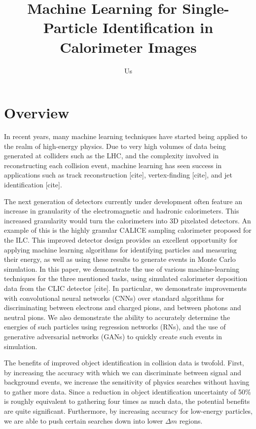 \documentclass{article}
\begin{document}
    \title{Machine Learning for Single-Particle Identification in Calorimeter Images}
    \author{Us}
    \date{}
    \maketitle

    \section*{Overview}

    In recent years, many machine learning techniques have started being applied to the realm of high-energy physics. Due to very high volumes of data being generated at colliders such as the LHC, and the complexity involved in reconstructing each collision event, machine learning has seen success in applications such as track reconstruction [cite], vertex-finding [cite], and jet identification [cite].

    The next generation of detectors currently under development often feature an increase in granularity of the electromagnetic and hadronic calorimeters. This increased granularity would turn the calorimeters into 3D pixelated detectors. An example of this is the highly granular CALICE sampling calorimeter proposed for the ILC. This improved detector design provides an excellent opportunity for applying machine learning algorithms for identifying particles and measuring their energy, as well as using these results to generate events in Monte Carlo simulation.  
    In this paper, we demonstrate the use of various machine-learning techniques for the three mentioned tasks, using simulated calorimeter deposition data from the CLIC detector [cite]. In particular, we demonstrate improvements with convolutional neural networks (CNNs) over standard algorithms for discriminating between electrons and charged pions, and between photons and neutral pions. We also demonstrate the ability to accurately determine the energies of such particles using regression networks (RNs), and the use of generative adversarial networks (GANs) to quickly create such events in simulation.

    The benefits of improved object identification in collision data is twofold. First, by increasing the accuracy with which we can discriminate between signal and background events, we increase the sensitivity of physics searches without having to gather more data. Since a reduction in object identification uncertainty of 50\% is roughly equivalent to gathering four times as much data, the potential benefits are quite significant. Furthermore, by increasing accuracy for low-energy particles, we are able to push certain searches down into lower $\Delta m$ regions.
\end{document}
